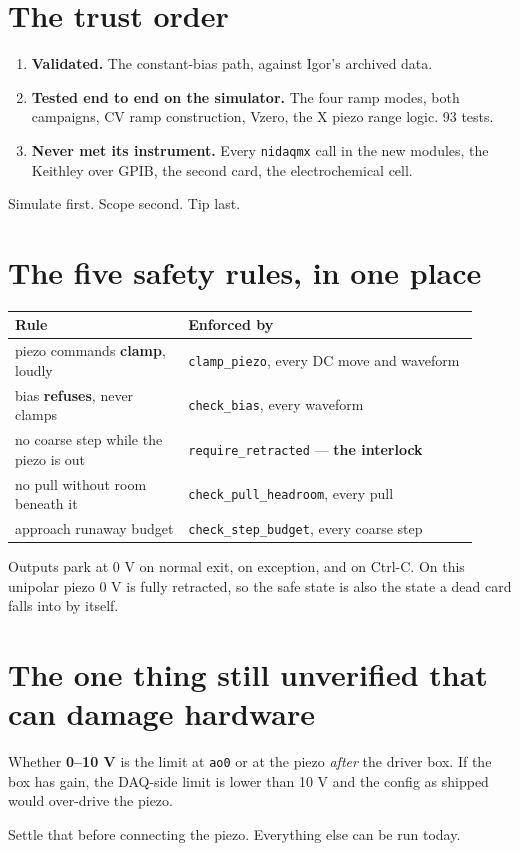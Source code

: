 \section{The trust order}

\begin{enumerate}[leftmargin=*]
\item \textbf{Validated.} The constant-bias path, against Igor's archived data.
\item \textbf{Tested end to end on the simulator.} The four ramp modes, both campaigns, CV ramp construction, Vzero, the X piezo range logic. 93 tests.
\item \textbf{Never met its instrument.} Every \texttt{nidaqmx} call in the new modules, the Keithley over GPIB, the second card, the electrochemical cell.
\end{enumerate}

Simulate first. Scope second. Tip last.

\section{The five safety rules, in one place}

\small\setlength{\LTleft}{0pt}\setlength{\LTright}{\fill}
\begin{longtable}{@{}>{\raggedright\arraybackslash}p{0.34\linewidth}>{\raggedright\arraybackslash}p{0.58\linewidth}@{}}
\toprule
\textbf{Rule} & \textbf{Enforced by} \\
\midrule\endhead
piezo commands \textbf{clamp}, loudly & \texttt{clamp\_\discretionary{}{}{}piezo}, every DC move and waveform \\
bias \textbf{refuses}, never clamps & \texttt{check\_\discretionary{}{}{}bias}, every waveform \\
no coarse step while the piezo is out & \texttt{require\_\discretionary{}{}{}retracted} --- \textbf{the interlock} \\
no pull without room beneath it & \texttt{check\_\discretionary{}{}{}pull\_\discretionary{}{}{}headroom}, every pull \\
approach runaway budget & \texttt{check\_\discretionary{}{}{}step\_\discretionary{}{}{}budget}, every coarse step \\
\bottomrule
\end{longtable}
\normalsize

Outputs park at 0 V on normal exit, on exception, and on Ctrl-C. On this unipolar piezo 0 V is fully retracted, so the safe state is also the state a dead card falls into by itself.

\section{The one thing still unverified that can damage hardware}

Whether \textbf{0--10 V} is the limit at \texttt{ao0} or at the piezo \emph{after} the driver box. If the box has gain, the DAQ-side limit is lower than 10 V and the config as shipped would over-drive the piezo.

Settle that before connecting the piezo. Everything else can be run today.
